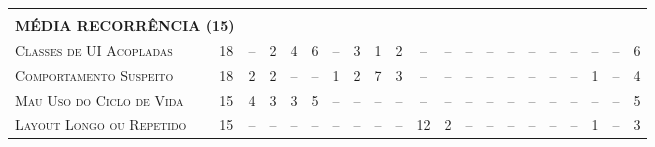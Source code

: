 \begin{table*}
\begin{tabular}{@{}p{4.2cm}p{0.3cm}p{.2cm}p{.2cm}p{.2cm}p{.2cm}p{.2cm}p{.2cm}p{.2cm}p{.2cm}p{.2cm}p{.4cm}p{.4cm}p{.4cm}p{.4cm}p{.4cm}p{.4cm}p{.4cm}p{.4cm}p{.4cm}p{0.2cm}@{}}
\vspace{1sp} \\
\multicolumn{2}{l}{\scriptsize{\textbf{MÉDIA RECORRÊNCIA (15)}}} \\ 
\textsc{Classes de UI Acopladas}           	& \multicolumn{1}{c}{18} 	& \multicolumn{1}{c}{--} 	& \multicolumn{1}{c}{2} 	& \multicolumn{1}{c}{4}	 	& \multicolumn{1}{c}{6} 	& \multicolumn{1}{c}{--} 	& \multicolumn{1}{c}{3} 	& \multicolumn{1}{c}{1} 	& \multicolumn{1}{c}{2} 	& \multicolumn{1}{c}{--} 	& \multicolumn{1}{c}{--} 	& \multicolumn{1}{c}{--} 	& \multicolumn{1}{c}{--} 	& \multicolumn{1}{c}{--} 	& \multicolumn{1}{c}{--} 	& \multicolumn{1}{c}{--}	& \multicolumn{1}{c}{--} 	& \multicolumn{1}{c}{--} 	& \multicolumn{1}{c}{--} 	& \multicolumn{1}{c}{6} \\
\textsc{Comportamento Suspeito}            	& \multicolumn{1}{c}{18} 	& \multicolumn{1}{c}{2} 	& \multicolumn{1}{c}{2} 	& \multicolumn{1}{c}{--} 	& \multicolumn{1}{c}{--} 	& \multicolumn{1}{c}{1} 	& \multicolumn{1}{c}{2} 	& \multicolumn{1}{c}{7} 	& \multicolumn{1}{c}{3} 	& \multicolumn{1}{c}{--} 	& \multicolumn{1}{c}{--} 	& \multicolumn{1}{c}{--} 	& \multicolumn{1}{c}{--} 	& \multicolumn{1}{c}{--} 	& \multicolumn{1}{c}{--} 	& \multicolumn{1}{c}{--}	& \multicolumn{1}{c}{--} 	& \multicolumn{1}{c}{1} 	& \multicolumn{1}{c}{--} 	& \multicolumn{1}{c}{4} \\
\textsc{Mau Uso do Ciclo de Vida}          	& \multicolumn{1}{c}{15} 	& \multicolumn{1}{c}{4} 	& \multicolumn{1}{c}{3} 	& \multicolumn{1}{c}{3}	 	& \multicolumn{1}{c}{5} 	& \multicolumn{1}{c}{--} 	& \multicolumn{1}{c}{--} 	& \multicolumn{1}{c}{--} 	& \multicolumn{1}{c}{--} 	& \multicolumn{1}{c}{--} 	& \multicolumn{1}{c}{--} 	& \multicolumn{1}{c}{--} 	& \multicolumn{1}{c}{--} 	& \multicolumn{1}{c}{--} 	& \multicolumn{1}{c}{--} 	& \multicolumn{1}{c}{--}	& \multicolumn{1}{c}{--} 	& \multicolumn{1}{c}{--} 	& \multicolumn{1}{c}{--} 	& \multicolumn{1}{c}{5} \\
\textsc{Layout Longo ou Repetido}          	& \multicolumn{1}{c}{15} 	& \multicolumn{1}{c}{--} 	& \multicolumn{1}{c}{--} 	& \multicolumn{1}{c}{--} 	& \multicolumn{1}{c}{--} 	& \multicolumn{1}{c}{--} 	& \multicolumn{1}{c}{--} 	& \multicolumn{1}{c}{--} 	& \multicolumn{1}{c}{--} 	& \multicolumn{1}{c}{12} 	& \multicolumn{1}{c}{2} 	& \multicolumn{1}{c}{--} 	& \multicolumn{1}{c}{--} 	& \multicolumn{1}{c}{--} 	& \multicolumn{1}{c}{--} 	& \multicolumn{1}{c}{--}	& \multicolumn{1}{c}{--} 	& \multicolumn{1}{c}{1} 	& \multicolumn{1}{c}{--} 	& \multicolumn{1}{c}{3} \\

\end{tabular}
\end{table*}
